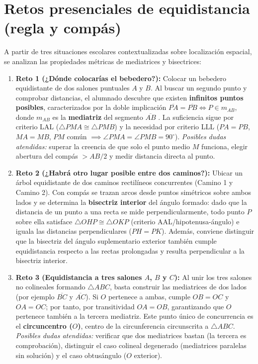 \documentclass[spanish,letterpaper,oneside]{article}
\begin{document}
\section{Retos presenciales de equidistancia (regla y compás)}
A partir de tres situaciones escolares contextualizadas sobre localización espacial, se analizan las propiedades métricas de mediatrices y bisectrices:
\begin{enumerate}
  \item \textbf{Reto 1 (¿Dónde colocarías el bebedero?):} Colocar un bebedero equidistante de dos salones puntuales $A$ y $B$. Al buscar un segundo punto y comprobar distancias, el alumnado descubre que existen \textbf{infinitos puntos posibles}, caracterizados por la doble implicación $\overline{PA}=\overline{PB} \iff P \in m_{AB}$, donde $m_{AB}$ es la \textbf{mediatriz} del segmento $\overline{AB}$ \citep{euclides_elementos}. La suficiencia sigue por criterio LAL ($\triangle PMA \cong \triangle PMB$) y la necesidad por criterio LLL ($PA=PB$, $MA=MB$, $PM$ común $\implies \angle PMA = \angle PMB = 90^\circ$). \textit{Posibles dudas atendidas:} superar la creencia de que solo el punto medio $M$ funciona, elegir abertura del compás $> AB/2$ y medir distancia directa al punto.
  \item \textbf{Reto 2 (¿Habrá otro lugar posible entre dos caminos?):} Ubicar un árbol equidistante de dos caminos rectilíneos concurrentes (Camino 1 y Camino 2). Con compás se trazan arcos desde puntos simétricos sobre ambos lados y se determina la \textbf{bisectriz interior} del ángulo formado: dado que la distancia de un punto a una recta se mide perpendicularmente, todo punto $P$ sobre ella satisface $\triangle OHP \cong \triangle OKP$ (criterio AAL/hipotenusa-ángulo) e iguala las distancias perpendiculares ($PH = PK$). Además, conviene distinguir que la bisectriz del ángulo suplementario exterior también cumple equidistancia respecto a las rectas prolongadas y resulta perpendicular a la bisectriz interior.
  \item \textbf{Reto 3 (Equidistancia a tres salones $A$, $B$ y $C$):} Al unir los tres salones no colineales formando $\triangle ABC$, basta construir las mediatrices de dos lados (por ejemplo $\overline{BC}$ y $\overline{AC}$). Si $O$ pertenece a ambas, cumple $OB = OC$ y $OA = OC$; por tanto, por transitividad $OA = OB$, garantizando que $O$ pertenece también a la tercera mediatriz. Este punto único de concurrencia es el \textbf{circuncentro ($O$)}, centro de la circunferencia circunscrita a $\triangle ABC$. \textit{Posibles dudas atendidas:} verificar que dos mediatrices bastan (la tercera es comprobación), distinguir el caso colineal degenerado (mediatrices paralelas sin solución) y el caso obtusángulo ($O$ exterior).
\end{enumerate}
\end{document}
